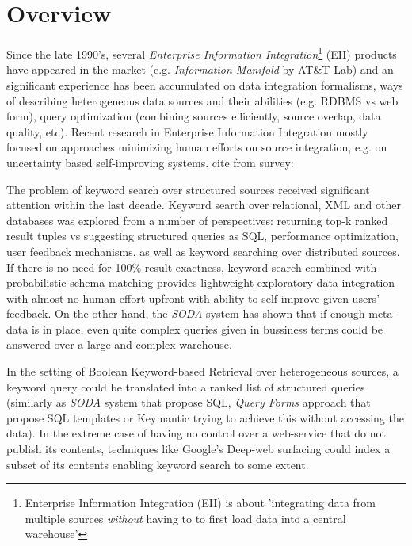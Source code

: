 
\section{Overview}


Since the late 1990's, several \textit{Enterprise Information Integration}\footnote{%
	Enterprise Information Integration (EII) is about 'integrating data from 
	multiple sources 	\textit{without} having to to first load data into
	 a central warehouse'\cite[p.1]{eii_2005}}
 (EII) products have appeared in the market (e.g. \textit{Information Manifold} by AT\&T Lab) and an significant experience has been accumulated on data integration formalisms, ways of describing heterogeneous data sources and their abilities (e.g. RDBMS vs web form), query optimization (combining sources efficiently, source overlap, data quality, etc)\cite{eii_2005}. 
%
Recent research in  Enterprise Information Integration mostly focused on approaches minimizing  human efforts on source integration, e.g. on uncertainty based self-improving systems\cite[ch.19]{principles_data_integration}.  {\color{red} cite from survey: \cite{IIHet_survey08}}

The problem of keyword search over structured sources received significant attention within the last decade. Keyword search over relational, XML and other databases was explored from a number of perspectives: returning top-k ranked result tuples vs suggesting structured queries as SQL, performance optimization, user feedback mechanisms, as well as keyword searching over distributed sources. 
%
If there is no need for 100\% result exactness, keyword search combined with probabilistic schema matching provides lightweight exploratory data integration with almost no human effort upfront with ability to self-improve given users' feedback\cite[ch.16]{principles_data_integration}. 
%
On the other hand, the \textit{SODA} system has shown that if enough meta-data is in place, even quite complex queries given in bussiness terms could be answered over a large and complex warehouse.

In the setting of Boolean Keyword-based Retrieval over heterogeneous sources, a keyword query could be translated into a ranked list of structured queries (similarly as \textit{SODA} system that propose SQL, \textit{Query Forms} approach that propose SQL templates or Keymantic trying to achieve this without accessing the data).
In the extreme case of having no control over a web-service that do not publish its contents, techniques like Google's Deep-web surfacing could index a subset of its contents enabling keyword search to some extent.



